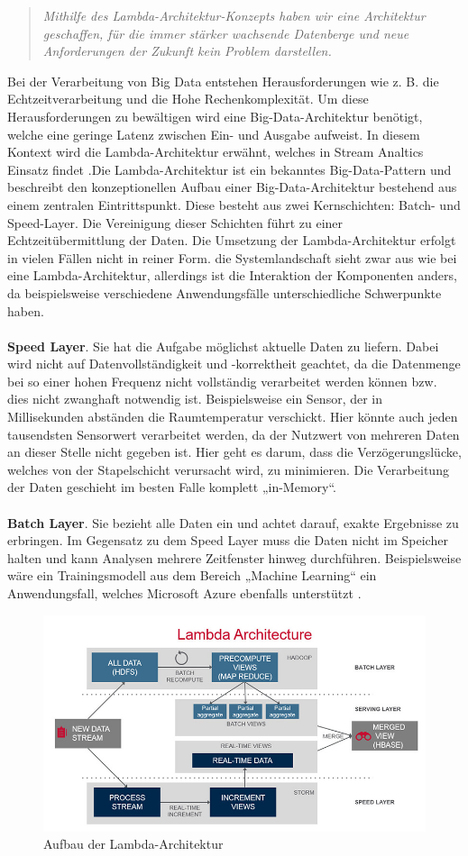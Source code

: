 \begin{quote} \textit{\glqq Mithilfe des Lambda-Architektur-Konzepts haben wir eine Architektur geschaffen, für die immer stärker wachsende Datenberge und neue Anforderungen der Zukunft kein Problem darstellen. \grqq~}\cite[S.2]{opitz.2017} \\ \end{quote} 
Bei der Verarbeitung von Big Data entstehen Herausforderungen wie z. B. die Echtzeitverarbeitung und die Hohe Rechenkomplexität. Um diese Herausforderungen zu bewältigen wird eine Big-Data-Architektur benötigt, welche eine geringe Latenz zwischen Ein- und Ausgabe aufweist. In diesem Kontext wird die Lambda-Architektur erwähnt, welches in Stream Analtics Einsatz findet \cite{Familiar.2017}.Die  Lambda-Architektur ist ein bekanntes Big-Data-Pattern und beschreibt den  konzeptionellen  Aufbau  einer  Big-Data-Architektur bestehend  aus  einem  zentralen  Eintrittspunkt. Diese besteht aus zwei Kernschichten: Batch- und Speed-Layer. Die Vereinigung dieser Schichten führt zu einer Echtzeitübermittlung der Daten. Die Umsetzung der Lambda-Architektur erfolgt in vielen Fällen nicht in reiner Form. die Systemlandschaft sieht zwar aus wie bei eine Lambda-Architektur, allerdings ist die Interaktion der Komponenten anders, da beispielsweise verschiedene Anwendungsfälle unterschiedliche Schwerpunkte haben.  \\ \\ \textbf{Speed Layer}. Sie hat die Aufgabe möglichst aktuelle Daten zu liefern. Dabei wird nicht auf Datenvollständigkeit und -korrektheit geachtet, da die Datenmenge bei so einer hohen Frequenz nicht vollständig verarbeitet werden können bzw. dies nicht zwanghaft notwendig ist. Beispielsweise ein Sensor, der in Millisekunden abständen die Raumtemperatur verschickt. Hier könnte auch jeden tausendsten Sensorwert verarbeitet werden, da der Nutzwert von mehreren Daten an dieser Stelle nicht gegeben ist. Hier geht es darum, dass die Verzögerungslücke, welches von der Stapelschicht verursacht wird, zu minimieren. Die Verarbeitung der Daten geschieht im besten Falle komplett „in-Memory“.\\ \\ \textbf{Batch Layer}. Sie bezieht alle Daten ein und achtet darauf, exakte Ergebnisse zu erbringen. Im Gegensatz zu dem Speed Layer muss die Daten nicht im Speicher halten und kann Analysen mehrere Zeitfenster hinweg durchführen. Beispielsweise wäre ein Trainingsmodell aus dem Bereich „Machine Learning“ ein Anwendungsfall, welches Microsoft Azure ebenfalls unterstützt \cite{Berle.2017}. 

\begin{figure}[h!]
	\centering
	\includegraphics[width=1.0\linewidth]{images/lambda-architecture}
	\caption{Aufbau der Lambda-Architektur} %
	\label{fig:cnn_structure}
\end{figure}